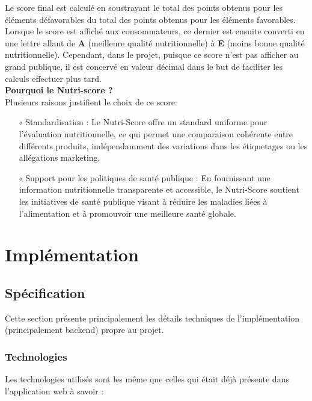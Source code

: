 \documentclass[11pt]{article}
\begin{document}
Le score final est calculé en soustrayant le total des points obtenus pour les éléments défavorables du total des points obtenus pour les éléments favorables. Lorsque le score est affiché aux consommateurs, ce dernier est ensuite converti en une lettre allant de \textbf{A} (meilleure qualité nutritionnelle) à \textbf{E} (moins bonne qualité nutritionnelle). Cependant, dans le projet, puisque ce score n'est pas afficher au grand publique, il est concervé en valeur décimal dans le but de faciliter les calculs effectuer plus tard.\\

\textbf{Pourquoi le Nutri-score ?}\\

Plusieurs raisons justifient le choix de ce score:\\

\begin{itemize}

    \item[$\circ$] Standardisation : Le Nutri-Score offre un standard uniforme pour l'évaluation nutritionnelle, ce qui permet une comparaison cohérente entre différents produits, indépendamment des variations dans les étiquetages ou les allégations marketing.\\

    \item[$\circ$] Support pour les politiques de santé publique : En fournissant une information nutritionnelle transparente et accessible, le Nutri-Score soutient les initiatives de santé publique visant à réduire les maladies liées à l'alimentation et à promouvoir une meilleure santé globale.
\end{itemize}


\newpage
\section{Implémentation}
\label{implementation}
\subsection{Spécification}
Cette section présente principalement les détails techniques de l'implémentation (principalement backend) propre au projet.

\subsubsection{Technologies}
Les technologies utilisés sont les même que celles qui était déjà présente dans l'application web à savoir :\\
\end{document}
